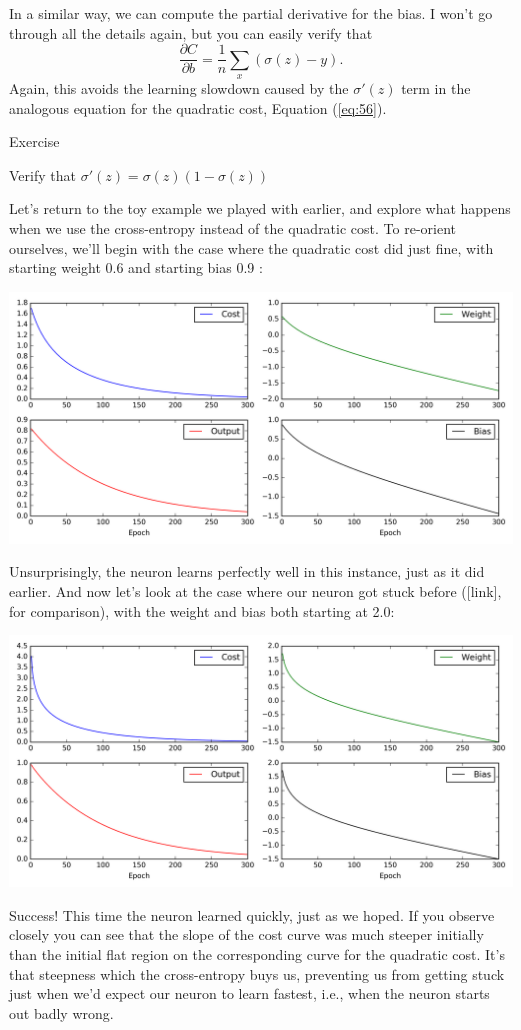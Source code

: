 \documentclass[a4paper,twoside,10pt]{book}
\begin{document}
In a similar way, we can compute the partial derivative for the bias. I won't go through all the details again, but you can easily verify that
\begin{equation}
	\frac{\partial C}{\partial b} = \frac{1}{n} \sum_x (\sigma(z)-y).
	\label{eq:62}
\end{equation}
Again, this avoids the learning slowdown caused by the $\sigma'(z)$ term in the analogous equation for the quadratic cost, Equation (\ref{eq:56}).

\begin{exercize}{Exercise}
	\item Verify that $\sigma'(z) = \sigma(z)(1-\sigma(z))$
\end{exercize}
Let's return to the toy example we played with earlier, and explore what happens when we use the cross-entropy instead of the quadratic cost. To re-orient ourselves, we'll begin with the case where the quadratic cost did just fine, with starting weight 0.6 and starting bias 0.9
:
\begin{center}%
	\includegraphics[width=0.75\linewidth]{./figures/ch3/animation_33}
\end{center}
Unsurprisingly, the neuron learns perfectly well in this instance, just as it did earlier. And now let's look at the case where our neuron got stuck before ([link], for comparison), with the weight and bias both starting at 2.0:
\begin{center}%
	\includegraphics[width=0.75\linewidth]{./figures/ch3/animation_34}
\end{center}
Success! This time the neuron learned quickly, just as we hoped. If you observe closely you can see that the slope of the cost curve was much steeper initially than the initial flat region on the corresponding curve for the quadratic cost. It's that steepness which the cross-entropy buys us, preventing us from getting stuck just when we'd expect our neuron to learn fastest, i.e., when the neuron starts out badly wrong.
\end{document}
